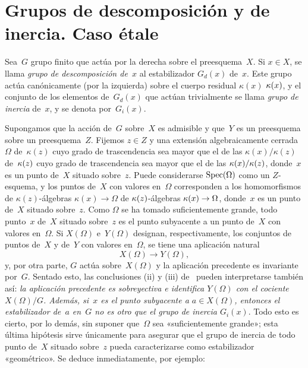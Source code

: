 
\section{Grupos de descomposición y de inercia. Caso étale}
\label{V.2}
Sea~$G$
grupo finito que actúa por la derecha sobre el preesquema~$X$. Si $x\in X$,
se llama
\emph{grupo de descomposición de~$x$}
%
%
al estabilizador $G_d(x)$ de~$x$. Este grupo actúa canónicamente (por la
izquierda) sobre el cuerpo residual
{$\kappa(x)$}
{$\kappa(x)$}, y el conjunto de los elementos de~$G_d(x)$ que actúan
trivialmente se llama 
\emph{grupo de inercia}
%
%
de~$x$, y se denota por~$G_i(x)$.

Supongamos que la acción de~$G$ sobre~$X$ es admisible y que~$Y$ es un
preesquema sobre un preesquema~$Z$. Fijemos $z\in Z$ y una extensión
algebraicamente cerrada~$\Omega$
{de~$\kappa(z)$ cuyo grado de trascendencia sea mayor que el de las
$\kappa(x)/\kappa(z)$}
{de~$\kappa(z)$ cuyo grado de trascendencia sea mayor que el de las
$\kappa(x)/\kappa(z)$}, donde~$x$ es un punto de~$X$ situado sobre~$z$. Puede
considerarse $\operatorname{Spec}(\Omega)$ como un $Z$-esquema, y los puntos de~$X$ con
valores en~$\Omega$ corresponden a los homomorfismos
{de $\kappa(z)$-álgebras $\kappa(x)\to\Omega$}
{de $\kappa(z)$-álgebras $\kappa(x)\to\Omega$}, donde~$x$ es un punto de~$X$
situado sobre~$z$. Como $\Omega$ se ha tomado suficientemente grande, todo
punto~$x$ de~$X$ situado sobre~$z$ es el punto subyacente a un punto de~$X$
con valores en~$\Omega$. Si $X(\Omega)$ e~$Y(\Omega)$ designan,
respectivamente, los conjuntos de puntos de~$X$ y de~$Y$ con valores
en~$\Omega$, se tiene una aplicación natural
$$
X(\Omega)\to Y(\Omega),
$$
y, por otra parte, $G$ actúa sobre~$X(\Omega)$ y la aplicación precedente es
invariante por~$G$. Sentado esto, las conclusiones (ii) y (iii)
de~ pueden interpretarse también así: \emph{la aplicación
precedente es sobreyectiva e identifica $Y(\Omega)$ con el cociente
$X(\Omega)/G$. Además, si~$x$ es el punto subyacente a $a\in X(\Omega)$,
entonces el estabilizador de~$a$ en~$G$ no es otro que el grupo de inercia
$G_i(x)$}. Todo esto es cierto, por lo demás, sin suponer que~$\Omega$ sea
«suficientemente grande»; esta última hipótesis sirve únicamente para
asegurar que el grupo de inercia de todo punto de~$X$ situado sobre~$z$ pueda
caracterizarse como estabilizador «geométrico». Se deduce inmediatamente,
por ejemplo:


